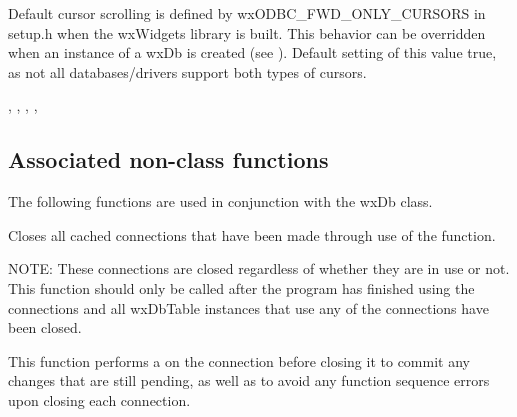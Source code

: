 



Default cursor scrolling is defined by wxODBC\_FWD\_ONLY\_CURSORS in setup.h
when the wxWidgets library is built.  This behavior can be overridden when
an instance of a wxDb is created (see ).
Default setting of this value true, as not all databases/drivers support
both types of cursors.


, ,
, ,

\subsection{Associated non-class functions}\label{wxdbfunctions}

The following functions are used in conjunction with the wxDb class.



Closes all cached connections that have been made through use of the
 function.

NOTE: These connections are closed regardless of whether they are in use
or not.  This function should only be called after the program has
finished using the connections and all wxDbTable instances that use any of
the connections have been closed.

This function performs a 
on the connection before closing it to commit any changes that are still
pending, as well as to avoid any function sequence errors upon closing
each connection.


